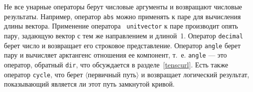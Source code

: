 \documentclass{article} %
\newcommand\invisgap{\nobreak\hskip0pt\relax}
\newcommand\tdescr[1]{$\langle$\invisgap#1\invisgap$\rangle$}
\begin{document}
Не все унарные операторы берут числовые аргументы и возвращают числовые 
результаты. 
Например, оператор {\tt abs} можно применять 
к паре для вычисления длины вектора.
Применение оператора {\tt 
unitvector}\label{Duvec} 
к паре производит опять пару, задающую вектор с тем же направлением и 
длиной~1. 
Оператор {\tt decimal}\label{Ddecop} 
берет число и возвращает его строковое представление.
Оператор {\tt angle}\label{Dangle} берет пару 
и вычисляет арктангенс отношения ее компонент, т.~е. {\tt angle} --- это 
оператор, обратный {\tt dir}, что обсуждается в разделе~\ref{tenscurl}. 
Есть также оператор {\tt cycle}\label{Dcycop}, что 
берет \tdescr{первичный путь} и возвращает логический результат, показывающий 
является ли этот путь замкнутой кривой.
\end{document}
